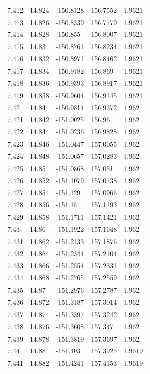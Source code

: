 \begin{tabular}{lllll}
7.412 & 14.824 & -150.8128 & 156.7552 & 1.9621 \\
7.413 & 14.826 & -150.8339 & 156.7779 & 1.9621 \\
7.414 & 14.828 & -150.855 & 156.8007 & 1.9621 \\
7.415 & 14.83 & -150.8761 & 156.8234 & 1.9621 \\
7.416 & 14.832 & -150.8971 & 156.8462 & 1.9621 \\
7.417 & 14.834 & -150.9182 & 156.869 & 1.9621 \\
7.418 & 14.836 & -150.9393 & 156.8917 & 1.9621 \\
7.419 & 14.838 & -150.9604 & 156.9145 & 1.9621 \\
7.42 & 14.84 & -150.9814 & 156.9372 & 1.962 \\
7.421 & 14.842 & -151.0025 & 156.96 & 1.962 \\
7.422 & 14.844 & -151.0236 & 156.9828 & 1.962 \\
7.423 & 14.846 & -151.0447 & 157.0055 & 1.962 \\
7.424 & 14.848 & -151.0657 & 157.0283 & 1.962 \\
7.425 & 14.85 & -151.0868 & 157.051 & 1.962 \\
7.426 & 14.852 & -151.1079 & 157.0738 & 1.962 \\
7.427 & 14.854 & -151.129 & 157.0966 & 1.962 \\
7.428 & 14.856 & -151.15 & 157.1193 & 1.962 \\
7.429 & 14.858 & -151.1711 & 157.1421 & 1.962 \\
7.43 & 14.86 & -151.1922 & 157.1648 & 1.962 \\
7.431 & 14.862 & -151.2133 & 157.1876 & 1.962 \\
7.432 & 14.864 & -151.2344 & 157.2104 & 1.962 \\
7.433 & 14.866 & -151.2554 & 157.2331 & 1.962 \\
7.434 & 14.868 & -151.2765 & 157.2559 & 1.962 \\
7.435 & 14.87 & -151.2976 & 157.2787 & 1.962 \\
7.436 & 14.872 & -151.3187 & 157.3014 & 1.962 \\
7.437 & 14.874 & -151.3397 & 157.3242 & 1.962 \\
7.438 & 14.876 & -151.3608 & 157.347 & 1.962 \\
7.439 & 14.878 & -151.3819 & 157.3697 & 1.962 \\
7.44 & 14.88 & -151.403 & 157.3925 & 1.9619 \\
7.441 & 14.882 & -151.4241 & 157.4153 & 1.9619 \\

\end{tabular}
